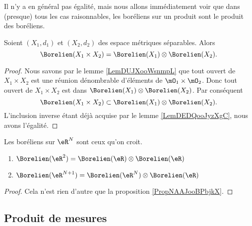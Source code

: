 Il n'y a en général pas égalité, mais nous allons immédiatement voir que dans (presque) tous les cas raisonnables, les boréliens sur un produit sont le produit des boréliens.

\begin{proposition}        \label{PropNAAJooBPbjkX}
    Soient \( (X_1,d_1)\) et \( (X_2,d_2)\) des espace métriques séparables. Alors
    \begin{equation}
        \Borelien(X_1\times X_2)=\Borelien(X_1)\otimes \Borelien(X_2).
    \end{equation}
\end{proposition}

\begin{proof}
    Nous savons par le lemme \ref{LemDUJXooWsnmpL} que tout ouvert de \( X_1\times X_2\) est une réunion dénombrable d'éléments de \( \mO_1\times\mO_2\). Donc tout ouvert de \( X_1\times X_2\) est dans \( \Borelien(X_1)\otimes \Borelien(X_2)\). Par conséquent
    \begin{equation}
        \Borelien(X_1\times X_2)\subset \Borelien(X_1)\otimes \Borelien(X_2).
    \end{equation}
    L'inclusion inverse étant déjà acquise par le lemme \ref{LemDEDQooJyzXgC}, nous avons l'égalité.
\end{proof}

\begin{proposition}     \label{CorWOOOooHcoEEF}
    Les boréliens sur \( \eR^N\) sont ceux qu'on croit.
    \begin{enumerate}
        \item
            \( \Borelien(\eR^2)=\Borelien(\eR)\otimes \Borelien(\eR)\)
        \item
            \( \Borelien(\eR^{N+1})=\Borelien(\eR^N)\otimes \Borelien(\eR)\)
    \end{enumerate}
\end{proposition}

\begin{proof}
    Cela n'est rien d'autre que la proposition \ref{PropNAAJooBPbjkX}.
\end{proof}

\subsection{Produit de mesures}

